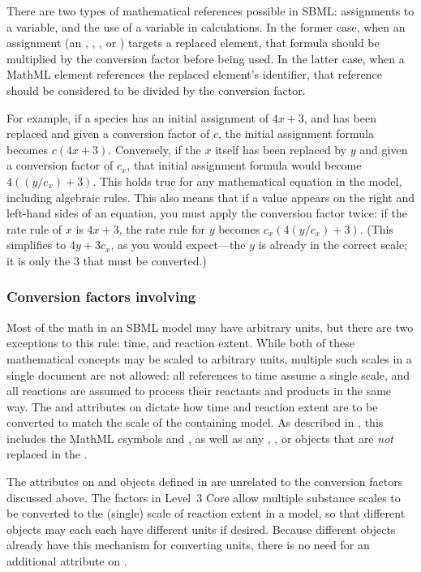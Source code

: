 There are two types of mathematical references possible in SBML:  assignments to a variable, and the use of a variable in calculations.  In the former case, when an assignment (an \InitialAssignment, \EventAssignment, \AssignmentRule, or \RateRule) targets a replaced element, that formula should be  multiplied by the conversion factor before being used.  In the latter case, when a MathML  element references the replaced element's identifier, that reference should be considered to be divided by the conversion factor.

For example, if a species has an initial assignment of $4x + 3$, and has been replaced and given a conversion factor of $c$, the initial assignment formula becomes $c (4x+3)$.  Conversely, if the $x$ itself has been replaced by $y$ and given a conversion factor of $c_x$, that initial assignment formula would become $4((y/c_x)+3)$.  This holds true for any mathematical equation in the model, including algebraic rules.  This also means that if a value appears on the right and left-hand sides of an equation, you must apply the conversion factor twice: if the rate rule of $x$ is $4x+3$, the rate rule for $y$ becomes $c_x(4(y/c_x) + 3)$.  (This simplifies to $4y + 3c_x$, as you would expect---the $y$ is already in the correct scale; it is only the $3$ that must be converted.)



\subsubsection{Conversion factors involving }

Most of the math in an SBML model may have arbitrary units, but there are two exceptions to this rule: time, and reaction extent.  While both of these mathematical concepts may be scaled to arbitrary units, multiple such scales in a single document are not allowed: all references to time assume a single scale, and all reactions are assumed to process their reactants and products in the same way.  The  and  attributes on \Submodel dictate how time and reaction extent are to be converted to match the scale of the containing model.  As described in , this includes the MathML csymbols  and , as well as any \Delay, \KineticLaw, or \RateRule objects that are \emph{not} replaced in the \Submodel.

The  attributes on \Species and \Model objects defined in \sbmlthreecore are unrelated to the conversion factors discussed above.  The factors in Level~3 Core allow multiple substance scales to be converted to the (single) scale of reaction extent in a model, so that different \Species objects may each each have different units if desired.  Because different \Species objects already have this mechanism for converting units, there is no need for an additional  attribute on \Submodel.

